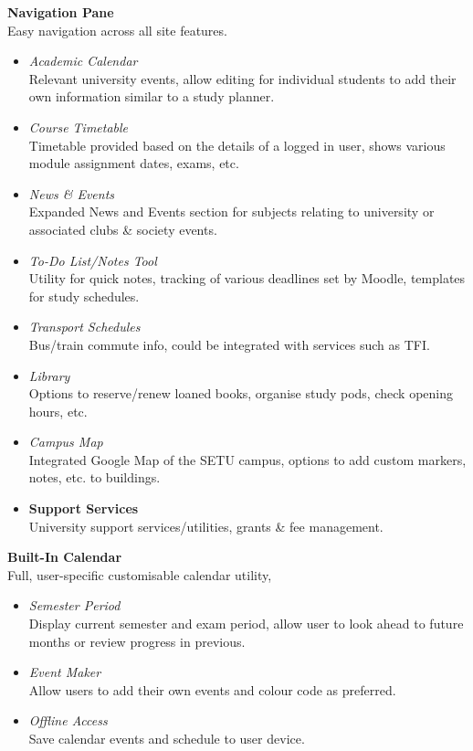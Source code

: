 \textbf{Navigation Pane}\\
Easy navigation across all site features.
\begin{itemize}
  \item \textit{Academic Calendar}\\
      Relevant university events, allow editing for individual students to add their own information similar to a study planner.
  \item \textit{Course Timetable}\\
         Timetable provided based on the details of a logged in user, shows various module assignment dates, exams, etc.
  \item \textit{News \& Events}\\
        Expanded News and Events section for subjects relating to university or associated clubs \& society events.
  \item \textit{To-Do List/Notes Tool}\\
         Utility for quick notes, tracking of various deadlines set by Moodle, templates for study schedules.
  \item \textit{Transport Schedules}\\
        Bus/train commute info, could be integrated with services such as TFI.
  \item \textit{Library}\\
        Options to reserve/renew loaned books, organise study pods, check opening hours, etc.
  \item \textit{Campus Map}\\
        Integrated Google Map of the SETU campus, options to add custom markers, notes, etc. to buildings.
   \item \textbf{Support Services} \\
        University support services/utilities, grants \& fee management. 
  \end{itemize}


\textbf{Built-In Calendar}\\
Full, user-specific customisable calendar utility, 
\begin{itemize}
  \item \textit{Semester Period}\\
        Display current semester and exam period, allow user to look ahead to future months or review progress in previous.
  \item \textit{Event Maker}\\
        Allow users to add their own events and colour code as preferred.
  \item \textit{Offline Access}\\
        Save calendar events and schedule to user device.
  \end{itemize}
  
